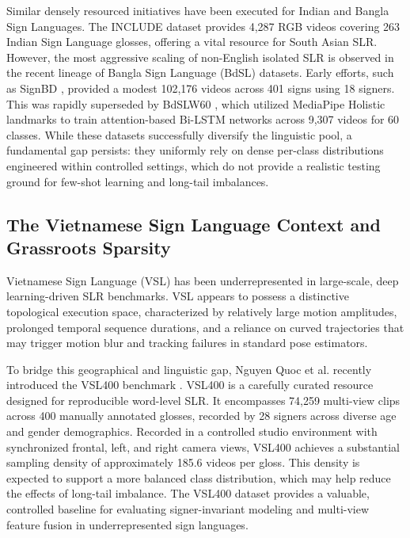 \documentclass{ieeeaccess}
\begin{document}
Similar densely resourced initiatives have been executed for Indian and Bangla Sign Languages. The INCLUDE dataset \cite{sridhar2020include} provides 4,287 RGB videos covering 263 Indian Sign Language glosses, offering a vital resource for South Asian SLR. However, the most aggressive scaling of non-English isolated SLR is observed in the recent lineage of Bangla Sign Language (BdSL) datasets. Early efforts, such as SignBD \cite{sams2023signbd}, provided a modest 102,176 videos across 401  signs using 18 signers. This was rapidly superseded by BdSLW60 \cite{rubaiyeat2025bdslw60}, which utilized MediaPipe Holistic landmarks to train attention-based Bi-LSTM networks across 9,307 videos for 60 classes. While these datasets successfully diversify the linguistic pool, a fundamental gap persists: they uniformly rely on dense per-class distributions engineered within controlled settings, which do not provide a realistic testing ground for few-shot learning and long-tail imbalances.

\subsection{The Vietnamese Sign Language Context and Grassroots Sparsity}
Vietnamese Sign Language (VSL) has been underrepresented in large-scale, deep learning-driven SLR benchmarks. VSL appears to possess a distinctive topological execution space, characterized by relatively large motion amplitudes, prolonged temporal sequence durations, and a reliance on curved trajectories that may trigger motion blur and tracking failures in standard pose estimators.

To bridge this geographical and linguistic gap, Nguyen Quoc et al. recently introduced the VSL400 benchmark \cite{nguyen2026vsl400}. VSL400 is a carefully curated resource designed for reproducible word-level SLR. It encompasses 74,259 multi-view clips across 400 manually annotated glosses, recorded by 28 signers across diverse age and gender demographics. Recorded in a controlled studio environment with synchronized frontal, left, and right camera views, VSL400 achieves a substantial sampling density of approximately 185.6 videos per gloss. This density is expected to support a more balanced class distribution, which may help reduce the effects of long-tail imbalance. The VSL400 dataset provides a valuable, controlled baseline for evaluating signer-invariant modeling and multi-view feature fusion in underrepresented sign languages.
\end{document}
